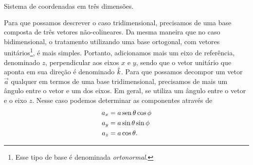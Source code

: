\begin{marginfigure}[-1.5cm]
\caption{Sistema de coordenadas em três dimensões.}
\end{marginfigure}

Para que possamos descrever o caso tridimensional, precisamos de uma base composta de três vetores não-colineares. Da mesma maneira que no caso bidimensional, o tratamento utilizando uma base ortogonal, com vetores unitários\footnote{Esse tipo de base é denominada \emph{ortonormal}.}, é mais simples. Portanto, adicionamos mais um eixo de referência, denominado $z$, perpendicular aos eixos $x$ e $y$, sendo que o vetor unitário que aponta em sua direção é denominado $\hat{k}$. Para que possamos decompor um vetor $\vec{a}$ qualquer em termos de uma base tridimensional, precisamos de mais um ângulo entre o vetor e um dos eixos. Em geral, se utiliza um ângulo entre o vetor e o eixo $z$. Nesse caso podemos determinar as componentes através de
\begin{align}
    a_x &= a \operatorname{sen}\theta\cos\phi \\
    a_y &= a \sin\theta\sin\phi \\
    a_z &= a \cos\theta.
\end{align}

